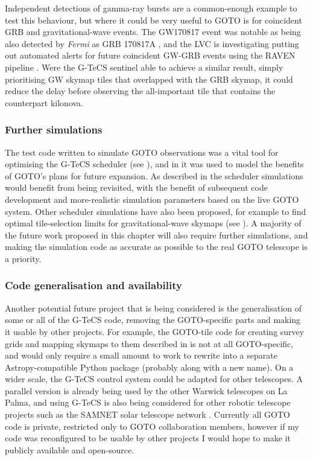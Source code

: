 \begin{colsection}
\begin{colsection}
Independent detections of gamma-ray bursts are a common-enough example to test this behaviour, but where it could be very useful to GOTO is for coincident GRB and gravitational-wave events. The GW170817 event was notable as being also detected by \textit{Fermi} as GRB 170817A \citep{GW170817_Fermi}, and the LVC is investigating putting out automated alerts for future coincident GW-GRB events using the RAVEN pipeline \citep{RAVEN, LVC_userguide}. Were the G-TeCS sentinel able to achieve a similar result, simply prioritising GW skymap tiles that overlapped with the GRB skymap, it could reduce the delay before observing the all-important tile that contains the counterpart kilonova.

\subsubsection{Further simulations}

The test code written to simulate GOTO observations was a vital tool for optimising the G-TeCS scheduler (see ), and in  it was used to model the benefits of GOTO's plans for future expansion. As described in  the scheduler simulations would benefit from being revisited, with the benefit of subsequent code development and more-realistic simulation parameters based on the live GOTO system. Other scheduler simulations have also been proposed, for example to find optimal tile-selection limits for gravitational-wave skymaps (see ). A majority of the future work proposed in this chapter will also require further simulations, and making the simulation code as accurate as possible to the real GOTO telescope is a priority.

\subsubsection{Code generalisation and availability}

Another potential future project that is being considered is the generalisation of some or all of the G-TeCS code, removing the GOTO-specific parts and making it usable by other projects. For example, the GOTO-tile code for creating survey grids and mapping skymaps to them described in  is not at all GOTO-specific, and would only require a small amount to work to rewrite into a separate Astropy-compatible Python package (probably along with a new name). On a wider scale, the G-TeCS control system could be adapted for other telescopes. A parallel version is already being used by the other Warwick telescopes on La Palma, and using G-TeCS is also being considered for other robotic telescope projects such as the SAMNET solar telescope network \citep{SAMNET}. Currently all GOTO code is private, restricted only to GOTO collaboration members, however if my code was reconfigured to be usable by other projects I would hope to make it publicly available and open-source.


\end{colsection}
\end{colsection}
